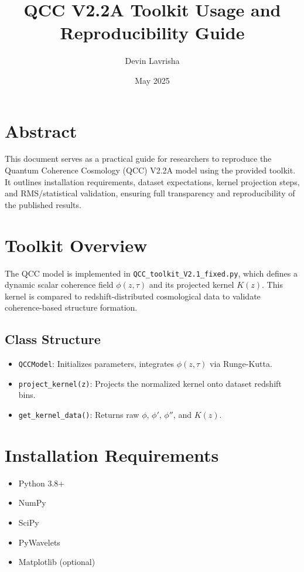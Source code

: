 \documentclass[12pt]{article}
\title{QCC V2.2A Toolkit Usage and Reproducibility Guide}
\author{Devin Lavrisha}
\date{May 2025}
\begin{document}
\maketitle

\section*{Abstract}
This document serves as a practical guide for researchers to reproduce the Quantum Coherence Cosmology (QCC) V2.2A model using the provided toolkit. It outlines installation requirements, dataset expectations, kernel projection steps, and RMS/statistical validation, ensuring full transparency and reproducibility of the published results.

\section{Toolkit Overview}
The QCC model is implemented in \texttt{QCC\_toolkit\_V2.1\_fixed.py}, which defines a dynamic scalar coherence field $\phi(z, \tau)$ and its projected kernel $K(z)$. This kernel is compared to redshift-distributed cosmological data to validate coherence-based structure formation.

\subsection*{Class Structure}
\begin{itemize}
\item \texttt{QCCModel}: Initializes parameters, integrates $\phi(z, \tau)$ via Runge-Kutta.
\item \texttt{project\_kernel(z)}: Projects the normalized kernel onto dataset redshift bins.
\item \texttt{get\_kernel\_data()}: Returns raw $\phi$, $\phi'$, $\phi''$, and $K(z)$.
\end{itemize}

\section{Installation Requirements}
\begin{itemize}
\item Python 3.8+
\item NumPy
\item SciPy
\item PyWavelets
\item Matplotlib (optional)
\end{itemize}
\end{document}
